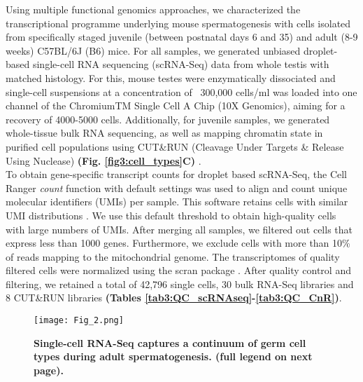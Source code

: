 Using multiple functional genomics approaches, we characterized the transcriptional programme underlying mouse spermatogenesis with cells isolated from specifically staged juvenile (between postnatal days 6 and 35) and adult (8-9 weeks) C57BL/6J (B6) mice. For all samples, we generated unbiased droplet-based single-cell RNA sequencing (scRNA-Seq) data from whole testis with matched histology. For this, mouse testes were enzymatically dissociated and single-cell suspensions at a concentration of ~300,000 cells/ml was loaded into one channel of the ChromiumTM Single Cell A Chip (10X Genomics), aiming for a recovery of 4000-5000 cells. Additionally, for juvenile samples, we generated whole-tissue bulk RNA sequencing, as well as mapping chromatin state in purified cell populations using CUT\&{}RUN (Cleavage Under Targets \& Release Using Nuclease) \textbf{(Fig. \ref{fig3:cell_types}C)} \citep{Skene2018}. \\
To obtain gene-specific transcript counts for droplet based scRNA-Seq, the Cell Ranger \emph{count} function with default settings was used to align and count unique molecular identifiers (UMIs) per sample. This software retains cells with similar UMI distributions \citep{Zheng2017}. We use this default threshold to obtain high-quality cells with large numbers of UMIs. After merging all samples, we filtered out cells that express less than 1000 genes. Furthermore, we exclude cells with more than 10\% of reads mapping to the mitochondrial genome. The transcriptomes of quality filtered cells were normalized using the scran package \citep{Lun2016pooling}. After quality control and filtering, we retained a total of 42,796 single cells, 30 bulk RNA-Seq libraries and 8 CUT\&{}RUN libraries \textbf{(Tables \ref{tab3:QC_scRNAseq}-\ref{tab3:QC_CnR})}.

\newpage

\begin{figure}[!h]
\centering
\texttt{[image: Fig\_2.png]}
\caption[Droplet based scRNAseq of mouse spermatogenesis]{\textbf{Single-cell RNA-Seq captures a continuum of germ cell types during adult spermatogenesis. (full legend on next page).}\\}
\label{fig2:cell_types}
\end{figure}

\newpage

